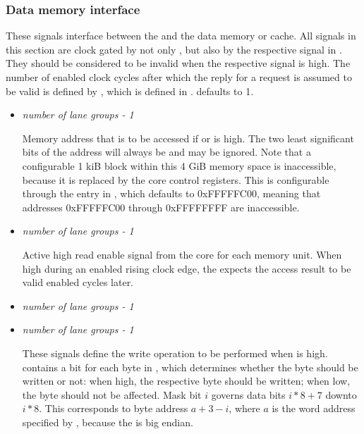 
\subsubsection{Data memory interface}
\label{sec:core-ug-cfg-inst-port-dmem}

These signals interface between the \rvex{} and the data memory or cache. All 
signals in this section are clock gated by not only , but also by 
the respective signal in . They should be considered to be 
invalid when the respective  signal is high. The number of 
enabled clock cycles after which the reply for a request is assumed to be valid 
is defined by , which is defined in . 
 defaults to 1.

\begin{itemize}
  
\item {}\textit{number of lane groups - 1}

Memory address that is to be accessed if  or 
 is high. The two least significant bits of the 
address will always be  and may be ignored. Note that a configurable 
1 kiB block within this 4 GiB memory space is inaccessible, because it is 
replaced by the core control registers. This is configurable through the 
 entry in , which defaults to 0xFFFFFC00, 
meaning that addresses 0xFFFFFC00 through 0xFFFFFFFF are inaccessible.

\vspace{1em}
\item {}\textit{number of lane groups - 1}

Active high read enable signal from the core for each memory unit. When high 
during an enabled rising clock edge, the \rvex{} expects the access result to be 
valid  enabled cycles later.

\vspace{1em}
\item {}\textit{number of lane groups - 1}
\item {}\textit{number of lane groups - 1}

These signals define the write operation to be performed when 
 is high.  contains a bit for 
each byte in , which determines whether the byte should 
be written or not: when high, the respective byte should be written; when low, 
the byte should not be affected. Mask bit $i$ governs data bits $i*8+7$ downto 
$i*8$. This corresponds to byte address $a + 3 - i$, where $a$ is the word
address specified by , because the \rvex{} is big endian.


\end{itemize}
